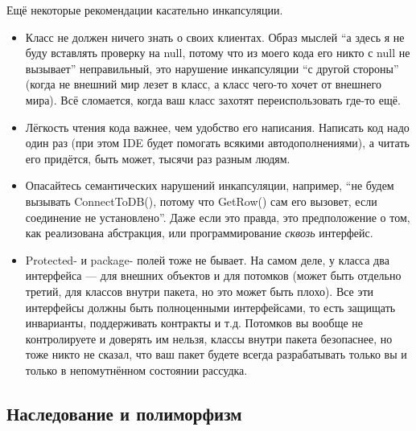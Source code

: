 \documentclass[a5paper]{article}
\begin{document}
Ещё некоторые рекомендации касательно инкапсуляции.

\begin{itemize}
	\item Класс не должен ничего знать о своих клиентах. Образ мыслей ``а здесь я не буду вставлять проверку на null, потому что из моего кода его никто с null не вызывает'' неправильный, это нарушение инкапсуляции ``с другой стороны'' (когда не внешний мир лезет в класс, а класс чего-то хочет от внешнего мира). Всё сломается, когда ваш класс захотят переиспользовать где-то ещё.
	\item Лёгкость чтения кода важнее, чем удобство его написания. Написать код надо один раз (при этом IDE будет помогать всякими автодополнениями), а читать его придётся, быть может, тысячи раз разным людям.
	\item Опасайтесь семантических нарушений инкапсуляции, например, ``не будем вызывать ConnectToDB(), потому что GetRow() сам его вызовет, если соединение не установлено''. Даже если это правда, это предположение о том, как реализована абстракция, или программирование \textit{сквозь} интерфейс.
	\item Protected- и package- полей тоже не бывает. На самом деле, у класса два интерфейса --- для внешних объектов и для потомков (может быть отдельно третий, для классов внутри пакета, но это может быть плохо). Все эти интерфейсы должны быть полноценными интерфейсами, то есть защищать инварианты, поддерживать контракты и т.д. Потомков вы вообще не контролируете и доверять им нельзя, классы внутри пакета безопаснее, но тоже никто не сказал, что ваш пакет будете всегда разрабатывать только вы и только в непомутнённом состоянии рассудка.
\end{itemize}

\subsection{Наследование и полиморфизм}
\end{document}
